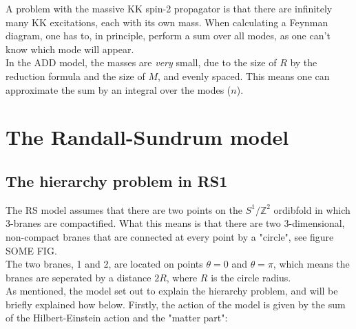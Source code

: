 \documentclass[11pt,a4paper]{article}
\begin{document}
%

A problem with the massive KK spin-2 propagator is that there are infinitely many KK excitations, each with its own mass. When calculating a Feynman diagram, one has to, in principle, perform a sum over all modes, as one can't know which mode will appear.\\
In the ADD model, the masses are \emph{very} small, due to the size of $R$ by the reduction formula and the size of $M$, and evenly spaced. This means one can approximate the sum by an integral over the modes ($n$).

\section{The Randall-Sundrum model}
\subsection{The hierarchy problem in RS1}
The RS model assumes that there are two points on the $S^1/\mathbb{Z}^2$ ordibfold in which 3-branes are compactified. What this means is that there are two 3-dimensional, non-compact branes that are connected at every point by a "circle", see figure SOME FIG.\\

%	

The two branes, 1 and 2, are located on points $\theta = 0$ and $\theta = \pi$, which means the branes are seperated by a distance $2R$, where $R$ is the circle radius.\\
As mentioned, the model set out to explain the hierarchy problem, and will be briefly explained how below. Firstly, the action of the model is given by the sum of the Hilbert-Einstein action and the "matter part":
\end{document}
